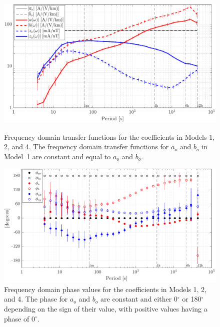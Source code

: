 \documentclass[draft,linenumbers]{agujournal2018}
\begin{document}
\begin{figure}[h]
  \centering
  \includegraphics[width=\textwidth]{figures/plot_model_summary_Z-options-1.pdf}
  \caption{Frequency domain transfer functions for the coefficients in Models 1, 2, and 4. The frequency domain transfer functions for $a_o$ and $b_o$ in Model~1 are constant and equal to $a_o$ and $b_o$.}
  \label{Z}

  \vspace{4em}

  \centering
  \includegraphics[width=\textwidth]{figures/plot_model_summary_Phi-options-1.pdf}
  \caption{Frequency domain phase values for the coefficients in Models 1, 2, and 4. The phase for $a_o$ and $b_o$ are constant and either 0$^{\circ}$ or 180$^{\circ}$ depending on the sign of their value, with positive values having a phase of 0$^{\circ}$.}
  \label{Phi}
\end{figure}
\end{document}
